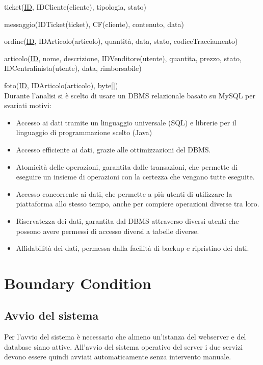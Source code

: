 \documentclass[12pt,a4paper]{article}
\begin{document}
\noindent
ticket(\underline{ID}, IDCliente(cliente), tipologia, stato)

\noindent
messaggio(IDTicket(ticket), CF(cliente), contenuto, data)

\noindent
ordine(\underline{ID}, IDArticolo(articolo), quantità, data, stato, codiceTracciamento)

\noindent
articolo(\underline{ID}, nome, descrizione, IDVenditore(utente), quantita, prezzo, stato, IDCentralinista(utente), data, rimborsabile)

\noindent
foto(\underline{ID}, IDArticolo(articolo), byte[]) \\

\noindent
Durante l'analisi si è scelto di usare un DBMS relazionale basato su MySQL per svariati motivi:

\begin{itemize}
\item Accesso ai dati tramite un linguaggio universale (SQL) e librerie per il linguaggio di programmazione scelto (Java)
\item Accesso efficiente ai dati, grazie alle ottimizzazioni del DBMS.
\item Atomicità delle operazioni, garantita dalle transazioni, che permette di eseguire un insieme di operazioni con la certezza che vengano tutte eseguite.
\item Accesso concorrente ai dati, che permette a più utenti di utilizzare la piattaforma allo stesso tempo, anche per compiere operazioni diverse tra loro.
\item Riservatezza dei dati, garantita dal DBMS attraverso diversi utenti che possono avere permessi di accesso diversi a tabelle diverse.
\item Affidabilità dei dati, permessa dalla facilità di backup e ripristino dei dati.
\end{itemize}

\newpage

\section{Boundary Condition}
\subsection{Avvio del sistema}
Per l'avvio del sistema è necessario che almeno un'istanza del webserver e del database siano attive.
All'avvio del sistema operativo del server i due servizi devono essere quindi avviati automaticamente senza intervento manuale.
\end{document}
